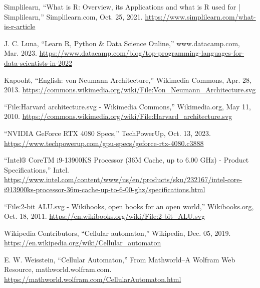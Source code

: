 \documentclass[12pt]{report} %
\begin{document}
\begin{singlespace}
\begin{thebibliography}{}
             Simplilearn, “What is R: Overview, its Applications and what is R used for | Simplilearn,” Simplilearn.com, Oct. 25, 2021. \href{https://www.simplilearn.com/what-is-r-article}{https://www.simplilearn.com/what-is-r-article}

             J. C. Luna, “Learn R, Python \& Data Science Online,” www.datacamp.com, Mar. 2023. \href{https://www.datacamp.com/blog/top-programming-languages-for-data-scientists-in-2022}{https://www.datacamp.com/blog/top-programming-languages-for-data-scientists-in-2022}

             Kapooht, “English: von Neumann Architecture,” Wikimedia Commons, Apr. 28, 2013. \href{https://commons.wikimedia.org/wiki/File:Von_Neumann_Architecture.svg}{https://commons.wikimedia.org/wiki/File:Von\_Neumann\_Architecture.svg}

             “File:Harvard architecture.svg - Wikimedia Commons,” Wikimedia.org, May 11, 2010. \href{https://commons.wikimedia.org/wiki/File:Harvard_architecture.svg}{https://commons.wikimedia.org/wiki/File:Harvard\_architecture.svg}

             “NVIDIA GeForce RTX 4080 Specs,” TechPowerUp, Oct. 13, 2023. \href{https://www.techpowerup.com/gpu-specs/geforce-rtx-4080.c3888}{https://www.techpowerup.com/gpu-specs/geforce-rtx-4080.c3888}

             “Intel® CoreTM i9-13900KS Processor (36M Cache, up to 6.00 GHz) - Product Specifications,” Intel. \href{https://www.intel.com/content/www/us/en/products/sku/232167/intel-core-i913900ks-processor-36m-cache-up-to-6-00-ghz/specifications.html}{https://www.intel.com/content/www/us/en/products/sku/232167/intel-core-i913900ks-processor-36m-cache-up-to-6-00-ghz/specifications.html}

             “File:2-bit ALU.svg - Wikibooks, open books for an open world,” Wikibooks.org, Oct. 18, 2011. \href{https://en.wikibooks.org/wiki/File:2-bit_ALU.svg}{https://en.wikibooks.org/wiki/File:2-bit\_ALU.svg}

             Wikipedia Contributors, “Cellular automaton,” Wikipedia, Dec. 05, 2019. \href{https://en.wikipedia.org/wiki/Cellular_automaton}{https://en.wikipedia.org/wiki/Cellular\_automaton}

             E. W. Weisstein, “Cellular Automaton,” From Mathworld--A Wolfram Web Resource, mathworld.wolfram.com. \href{https://mathworld.wolfram.com/CellularAutomaton.html}{https://mathworld.wolfram.com/CellularAutomaton.html}


\end{thebibliography}
\end{singlespace}
\end{document}
